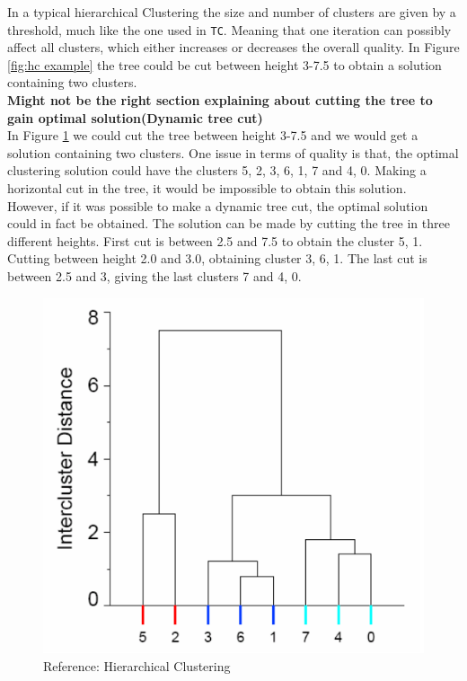 \documentclass[a4paper,10pt]{article}
\theoremstyle{plain}
\theoremstyle{definition}
\begin{document}
In a typical hierarchical Clustering the size and number of clusters are given by a threshold, much like the one used in \texttt{TC}. Meaning that one iteration can possibly affect all clusters, which either increases or decreases the overall quality. In Figure \ref{fig:hc example} the tree could be cut between height 3-7.5 to obtain a solution containing two clusters.
\\\textbf{Might not be the right section explaining about cutting the tree to gain optimal solution(Dynamic tree cut)}\\
In Figure \ref{fig:hc quality example} we could cut the tree between height 3-7.5 and we would get a solution containing two clusters. One issue in terms of quality is that, the optimal clustering solution could have the clusters {5, 2}, {3, 6, 1},  {7} and {4, 0}. Making a horizontal cut in the tree, it would be impossible to obtain this solution. However, if it was possible to make a dynamic tree cut, the optimal solution could in fact be obtained. The solution can be made by cutting the tree in three different heights. First cut is between 2.5 and 7.5 to obtain the cluster {5, 1}. Cutting between height 2.0 and 3.0, obtaining cluster {3, 6, 1}. The last cut is between 2.5 and 3, giving the last clusters {7} and {4, 0}.
\begin{figure}[H]
	\centering
	\includegraphics*[scale=0.4]{./pictures/hc/hc_quality_example.png}
	\caption{Reference: Hierarchical Clustering}
	\label{fig:hc quality example}
\end{figure}
\end{document}
